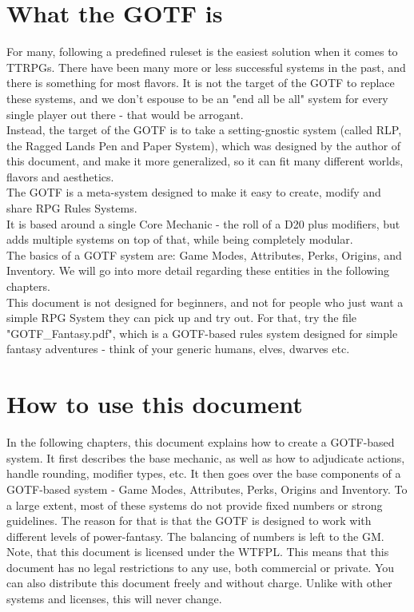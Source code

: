 \documentclass{article}
\begin{document}
\section{What the GOTF is}\label{sec:gotfexplanation}
	For many, following a predefined ruleset is the easiest solution when it comes to TTRPGs.
	There have been many more or less successful systems in the past, and there is something for most flavors.
	It is not the target of the GOTF to replace these systems, and we don't espouse to be an "end all be all" system for every single player out there - that would be arrogant.\\
	Instead, the target of the GOTF is to take a setting-gnostic system (called RLP, the Ragged Lands Pen and Paper System), which was designed by the author of this document, and make it more generalized, so it can fit many different worlds, flavors and aesthetics.\\
	The GOTF is a meta-system designed to make it easy to create, modify and share RPG Rules Systems.\\
	It is based around a single Core Mechanic - the roll of a D20 plus modifiers, but adds multiple systems on top of that, while being completely modular.\\
	The basics of a GOTF system are: Game Modes, Attributes, Perks, Origins, and Inventory.
	We will go into more detail regarding these entities in the following chapters.\\
	This document is not designed for beginners, and not for people who just want a simple RPG System they can pick up and try out.
	For that, try the file "GOTF\_Fantasy.pdf", which is a GOTF-based rules system designed for simple fantasy adventures - think of your generic humans, elves, dwarves etc.

\section{How to use this document}\label{sec:howtouse}
	In the following chapters, this document explains how to create a GOTF-based system.
	It first describes the base mechanic, as well as how to adjudicate actions, handle rounding, modifier types, etc.
	It then goes over the base components of a GOTF-based system - Game Modes, Attributes, Perks, Origins and Inventory.
	To a large extent, most of these systems do not provide fixed numbers or strong guidelines.
	The reason for that is that the GOTF is designed to work with different levels of power-fantasy.
	The balancing of numbers is left to the GM.
	Note, that this document is licensed under the WTFPL.
	This means that this document has no legal restrictions to any use, both commercial or private.
	You can also distribute this document freely and without charge.
	Unlike with other systems and licenses, this will never change.
\end{document}
